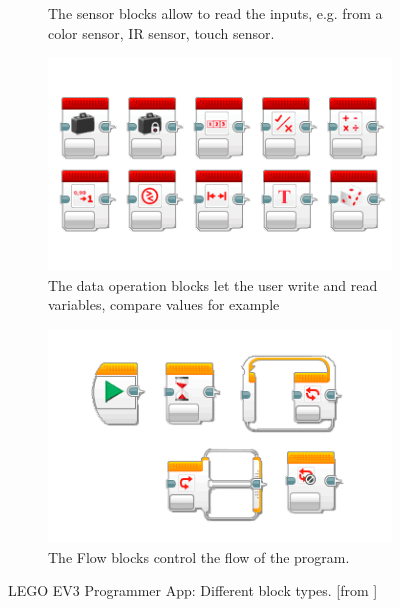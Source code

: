 \documentclass[runningheads,a4paper]{llncs}
\begin{document}
\begin{figure}[H]
\begin{subfigure}[t]{0.45\textwidth}
\caption{The sensor blocks allow to read the inputs, e.g. from a color sensor, IR sensor, touch sensor.} \label{fig:sensorblocks}\end{subfigure}
\begin{subfigure}[t]{0.45\textwidth}\centering\includegraphics[width=.9\columnwidth]{images/LearnToProgram_operations_blocks_landscape.png}
\caption{The data operation blocks let the user write and read variables, compare values for example }\label{fig:operationsblocks}\end{subfigure}\hspace*{\fill}
\begin{subfigure}[t]{0.45\textwidth}\centering\includegraphics[width=.9\columnwidth]{images/LearnToProgram_flow_blocks_landscape.png}
\caption{The Flow blocks control the flow of the program.}\label{fig:flowblocks}\end{subfigure}
\caption{LEGO EV3 Programmer App: Different block types. [from \cite{legoev3}]}
\end{figure}
  
\end{document}
